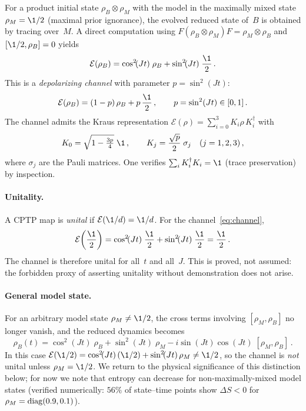 For a product initial state $\rho_B \otimes \rho_M$ with the model
in the maximally mixed state $\rho_M = \1/2$ (maximal prior
ignorance), the evolved reduced state of~$B$ is obtained by tracing
over~$M$.  A direct computation using $F(\rho_B\otimes\rho_M)F
= \rho_M\otimes\rho_B$ and $[\1/2, \rho_B] = 0$ yields
\begin{equation}
  \mathcal{E}(\rho_B) = \cos^2\!(Jt)\;\rho_B
    + \sin^2\!(Jt)\;\frac{\1}{2} \,.
  \label{eq:channel}
\end{equation}
This is a \emph{depolarizing channel} with parameter $p = \sin^2(Jt)$:
\begin{equation}
  \mathcal{E}(\rho_B) = (1-p)\,\rho_B + p\,\frac{\1}{2} \,,
  \qquad p = \sin^2(Jt) \in [0,1] \,.
  \label{eq:depolarizing}
\end{equation}
The channel admits the Kraus representation $\mathcal{E}(\rho)
= \sum_{i=0}^{3} K_i \rho\, K_i^\dagger$ with
\begin{equation}
  K_0 = \sqrt{1 - \tfrac{3p}{4}}\;\1 \,,
  \qquad
  K_j = \frac{\sqrt{p}}{2}\;\sigma_j
  \quad (j = 1,2,3) \,,
  \label{eq:kraus}
\end{equation}
where $\sigma_j$ are the Pauli matrices.  One verifies
$\sum_i K_i^\dagger K_i = \1$ (trace preservation) by inspection.

\paragraph{Unitality.}
A CPTP map is \emph{unital} if $\mathcal{E}(\1/d) = \1/d$.  For
the channel~\eqref{eq:channel},
\begin{equation}
  \mathcal{E}\!\left(\frac{\1}{2}\right)
  = \cos^2\!(Jt)\;\frac{\1}{2} + \sin^2\!(Jt)\;\frac{\1}{2}
  = \frac{\1}{2} \,.
  \label{eq:unitality}
\end{equation}
The channel is therefore unital for all~$t$ and all~$J$.  This is
proved, not assumed: the forbidden proxy of asserting unitality
without demonstration does not arise.

\paragraph{General model state.}
For an arbitrary model state $\rho_M \neq \1/2$, the cross terms
involving $[\rho_M, \rho_B]$ no longer vanish, and the reduced
dynamics becomes
\begin{equation}
  \rho_B(t) = \cos^2\!(Jt)\;\rho_B + \sin^2\!(Jt)\;\rho_M
    - i\sin(Jt)\cos(Jt)\;[\rho_M, \rho_B] \,.
  \label{eq:channel-general}
\end{equation}
In this case
$\mathcal{E}(\1/2) = \cos^2\!(Jt)\,(\1/2) + \sin^2\!(Jt)\,\rho_M
\neq \1/2$, so the channel is \emph{not} unital unless
$\rho_M = \1/2$.  We return to the physical significance of this
distinction below; for now we note that entropy can decrease for
non-maximally-mixed model states (verified numerically:
$56\%$ of state--time points show $\Delta S < 0$ for
$\rho_M = \operatorname{diag}(0.9, 0.1)$).

